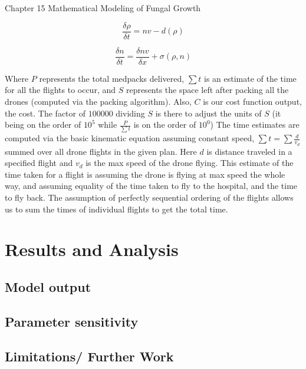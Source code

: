 \documentclass[12pt]{article}
\begin{document}
\begin{multicols}{2}
Chapter 15 Mathematical Modeling of Fungal Growth

\begin{equation}
\frac{\delta\rho}{\delta t}=nv-d(\rho)
\end{equation}

\begin{equation}
\frac{\delta n}{\delta t}=\frac{\delta nv}{\delta x}+\sigma(\rho, n)
\end{equation}


Where $P$ represents the total medpacks delivered, $\sum{t}$ is an estimate of the time for all the flights to occur, and $S$ represents the space left after packing all the drones (computed via the packing algorithm). Also, $C$ is our cost function output, the cost. The factor of $100000$ dividing $S$ is there to adjust the units of $S$ (it being on the order of $10^5$ while $\frac{P}{\sum{t}}$ is on the order of $10^0$) The time estimates are computed via the basic kinematic equation assuming constant speed, $\sum{t}=\sum{\frac{d}{v_d}}$ summed over all drone flights in the given plan. Here $d$ is distance traveled in a specified flight and $v_d$ is the max speed of the drone flying. This estimate of the time taken for a flight is assuming the drone is flying at max speed the whole way, and assuming equality of the time taken to fly to the hospital, and the time to fly back. The assumption of perfectly sequential ordering of the flights allows us to sum the times of individual flights to get the total time.

\section{Results and Analysis}

\subsection{Model output}
\lipsum[6]

\subsection{Parameter sensitivity}
\lipsum[7]




\subsection{Limitations/ Further Work}
\lipsum[8]

\printbibliography
\end{multicols}
\end{document}
